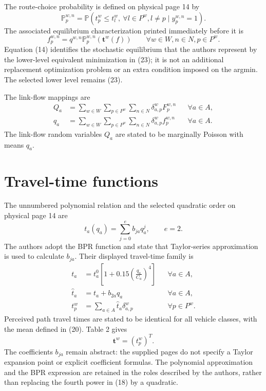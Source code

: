 \documentclass{article}
\begin{document}
The route-choice probability is defined on physical page 14 by
\begin{equation}
\mathbb P_p^{w,n}
=\mathbb P\left(t_p^w\leq t_l^w,\ \forall l\in P^w,l\ne p
\mid y_p^{w,n}=1\right).\tag{15}
\end{equation}
The associated equilibrium characterization printed immediately before it is
\begin{equation}
f_p^{w,n}=q^{w,n}\mathbb P_p^{w,n}\left(\mathbf t^w(f)\right)
\qquad\forall w\in W,n\in N,p\in P^w.\tag{14}
\end{equation}
Equation (14) identifies the stochastic equilibrium that the authors represent by the lower-level equivalent minimization in (23); it is not an additional replacement optimization problem or an extra condition imposed on the argmin. The selected lower level remains (23).

The link-flow mappings are
\begin{align}
Q_a&=\sum_{w\in W}\sum_{p\in P^w}\sum_{n\in N}
\delta_{a,p}^wF_p^{w,n} &&\forall a\in A,\tag{16}\\
q_a&=\sum_{w\in W}\sum_{p\in P^w}\sum_{n\in N}
\delta_{a,p}^wf_p^{w,n} &&\forall a\in A.\tag{17}
\end{align}
The link-flow random variables $Q_a$ are stated to be marginally Poisson with means $q_a$.

\section*{Travel-time functions}
The unnumbered polynomial relation and the selected quadratic order on physical page 14 are
\[
t_a(q_a)=\sum_{j=0}^{e}b_{ja}q_a^j,\qquad e=2.
\]
The authors adopt the BPR function and state that Taylor-series approximation is used to calculate $b_{ja}$. Their displayed travel-time family is
\begin{align}
t_a&=t_a^0\left[1+0.15\left(\frac{q_a}{C_a}\right)^4\right]
&&\forall a\in A,\tag{18}\\
\hat t_a&=t_a+b_{2a}q_a &&\forall a\in A,\tag{19}\\
t_p^w&=\sum_{a\in A}\hat t_a\delta_{a,p}^w
&&\forall p\in P^w.\tag{20}
\end{align}
Perceived path travel times are stated to be identical for all vehicle classes, with the mean defined in (20). Table 2 gives
\[
\mathbf t^w=(t_p^w)^T.
\]
The coefficients $b_{ja}$ remain abstract: the supplied pages do not specify a Taylor expansion point or explicit coefficient formulas. The polynomial approximation and the BPR expression are retained in the roles described by the authors, rather than replacing the fourth power in (18) by a quadratic.
\end{document}
